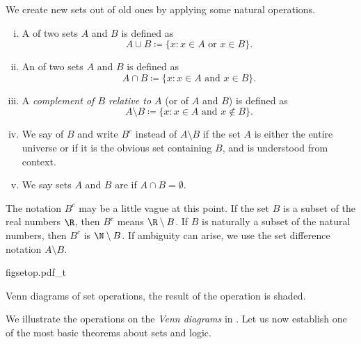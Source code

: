 We create new sets out of old ones by applying some natural operations.

\begin{defn}
\pagebreak[2]
\leavevmode
\begin{enumerate}[(i)]
\item
A \emph{} of two sets $A$ and $B$ is defined as
\begin{equation*}
A \cup B \coloneqq \{ x : x \in A \text{ or } x \in B \} .
\end{equation*}
\item
An \emph{} of two sets $A$ and $B$ is defined as
\begin{equation*}
A \cap B \coloneqq \{ x : x \in A \text{ and } x \in B \} .
\end{equation*}
\item
A \emph{complement of $B$ relative to $A$}
(or \emph{} of $A$ and $B$) is defined as
\begin{equation*}
A \setminus B \coloneqq \{ x : x \in A \text{ and } x \notin B \} .
\end{equation*}
\item
We say
\emph{} of $B$ and write $B^c$ 
instead of $A \setminus B$ if
the set $A$ is either the entire universe or if it is the obvious
set containing $B$, and is understood from context.
\item
We say sets $A$ and $B$ are \emph{} if $A \cap B =
\emptyset$.
\end{enumerate}
\end{defn}

The notation $B^c$ may be a little vague at this point.  If
the set $B$ is a subset of the real numbers $\R$, then $B^c$ means
$\R \setminus B$.  If $B$ is naturally a subset of the natural numbers,
then $B^c$
is $\N \setminus B$.  If ambiguity can arise, we 
use the set difference notation $A \setminus B$.

\begin{myfigureht}
{figsetop.pdf_t}
\caption{Venn diagrams of set operations, the result of the operation is
shaded.\label{figsetop}}
\end{myfigureht}
We illustrate the operations on the
\emph{Venn diagrams} in .
Let us now establish one of the most basic theorems about sets and logic.

